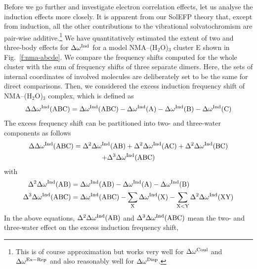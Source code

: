 \documentclass[b5paper,oneside,fleqn,11pt]{book}
\begin{document}
\begin{refsection}
Before we go further and investigate electron correlation
effects, let us analyse the induction effects more closely.
It is apparent from our SolEFP theory that, except from induction, 
all the other contributions to the vibrational solvatochromism
are pair\hyp{}wise additive.\footnote{This is of course approximation
but works very well for $\Delta\omega^{\rm Coul}$ and $\Delta\omega^{\rm Ex-Rep}$
and also reasonably well for $\Delta\omega^{\rm Disp}$.} 
We have quantitatively estimated
the extent of two and three\hyp{}body effects for $\Delta\omega^{\rm Ind}$
for a model NMA--(H$_2$O)$_3$ cluster E shown in Fig.~\ref{f:nma-abcde}. 
We compare the frequency shifts computed for the whole cluster 
with the sum of frequency shifts of three
separate dimers. Here, the sets of internal coordinates of
involved molecules are deliberately set to be the same for
direct comparisons. Then, we considered the excess induction
frequency shift of NMA--(H$_2$O)$_3$
complex, which is defined as
%
\begin{equation}
\Delta\Delta\omega^{\rm Ind}(\text{ABC}) = \Delta\omega^{\rm Ind}(\text{ABC})
 - \Delta\omega^{\rm Ind}(\text{A}) - \Delta\omega^{\rm Ind}(\text{B}) - \Delta\omega^{\rm Ind}(\text{C})
\end{equation}
%
The excess frequency shift can be partitioned into two\hyp{} and three\hyp{}water components as follows 
%
\begin{multline}
\Delta\Delta\omega^{\rm Ind}(\text{ABC}) = 
\Delta^2\Delta\omega^{\rm Ind}(\text{AB}) +
\Delta^2\Delta\omega^{\rm Ind}(\text{AC}) +
\Delta^2\Delta\omega^{\rm Ind}(\text{BC}) \\+
\Delta^3\Delta\omega^{\rm Ind}(\text{ABC})
\end{multline}
%
with
%
\begin{subequations}
\begin{align}
\Delta^2\Delta\omega^{\rm Ind}(\text{AB}) &= 
   \Delta\omega^{\rm Ind}(\text{AB}) - 
   \Delta\omega^{\rm Ind}(\text{A})  -
   \Delta\omega^{\rm Ind}(\text{B}) \\
\Delta^3\Delta\omega^{\rm Ind}(\text{ABC})&=
   \Delta\omega^{\rm Ind}(\text{ABC}) -
\sum_\text{X} \Delta\omega^{\rm Ind}(\text{X}) -
\sum_{\text{X}<\text{Y}} \Delta^2\Delta\omega^{\rm Ind}(\text{XY})
\end{align}
\end{subequations}
%
In the above equations, $\Delta^2\Delta\omega^{\rm Ind}(\text{AB})$
and $\Delta^3\Delta\omega^{\rm Ind}(\text{ABC})$
mean the two\hyp{} and three\hyp{}water effect on the excess induction frequency shift,

\end{refsection}
\end{document}
